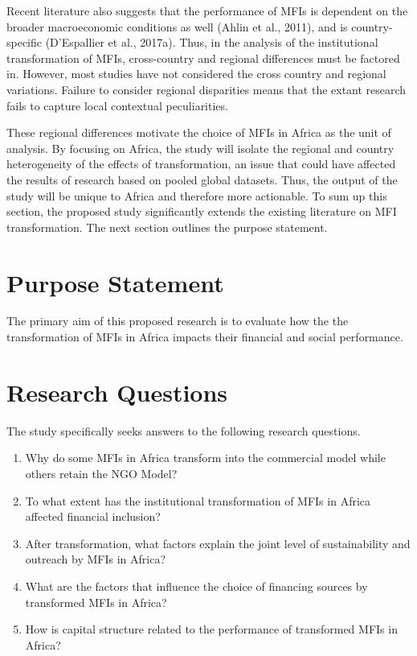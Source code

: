 \documentclass[a4paper, nobind]{templates/ociamthesis}
\providecommand{\tightlist}{%
  \setlength{\itemsep}{0pt}\setlength{\parskip}{0pt}}
\begin{document}
Recent literature also suggests that the performance of MFIs is dependent on the broader macroeconomic conditions as well (Ahlin et al., 2011), and is country-specific (D'Espallier et al., 2017a). Thus, in the analysis of the institutional transformation of MFIs, cross-country and regional differences must be factored in. However, most studies have not considered the cross country and regional variations. Failure to consider regional disparities means that the extant research fails to capture local contextual peculiarities.

These regional differences motivate the choice of MFIs in Africa as the unit of analysis. By focusing on Africa, the study will isolate the regional and country heterogeneity of the effects of transformation, an issue that could have affected the results of research based on pooled global datasets. Thus, the output of the study will be unique to Africa and therefore more actionable. To sum up this section, the proposed study significantly extends the existing literature on MFI transformation. The next section outlines the purpose statement.

\hypertarget{purpose-statement}{%
\section{Purpose Statement}\label{purpose-statement}}

\noindent The primary aim of this proposed research is to evaluate how the the transformation of MFIs in Africa impacts their financial and social performance.

\hypertarget{research-questions}{%
\section{Research Questions}\label{research-questions}}

\noindent The study specifically seeks answers to the following research questions.

\begin{enumerate}
\def\labelenumi{\arabic{enumi}.}
\tightlist
\item
  Why do some MFIs in Africa transform into the commercial model while others retain the NGO Model?
\item
  To what extent has the institutional transformation of MFIs in Africa affected financial inclusion?
\item
  After transformation, what factors explain the joint level of sustainability and outreach by MFIs in Africa?
\item
  What are the factors that influence the choice of financing sources by transformed MFIs in Africa?
\item
  How is capital structure related to the performance of transformed MFIs in Africa?
\end{enumerate}
\end{document}
